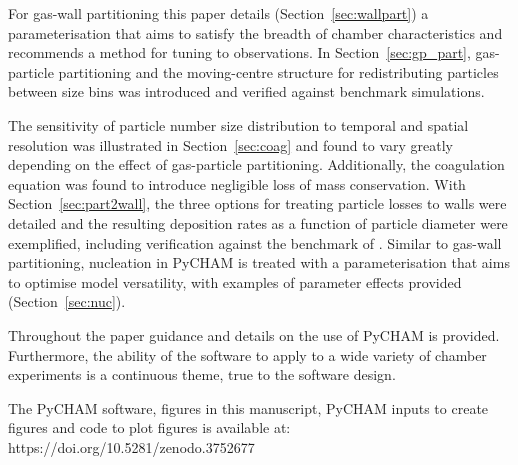 \documentclass[gmd, manuscript]{copernicus}
\begin{document}
For gas-wall partitioning this paper details (Section~\ref{sec:wallpart}) a parameterisation that aims to satisfy the breadth of chamber characteristics and recommends a method for tuning to observations.  In Section~\ref{sec:gp_part}, gas-particle partitioning and the moving-centre structure for redistributing particles between size bins was introduced and verified against benchmark simulations.

The sensitivity of particle number size distribution to temporal and spatial resolution was illustrated in Section~\ref{sec:coag} and found to vary greatly depending on the effect of gas-particle partitioning.  Additionally, the coagulation equation was found to introduce negligible loss of mass conservation.  With Section~\ref{sec:part2wall}, the three options for treating particle losses to walls were detailed and the resulting deposition rates as a function of particle diameter were exemplified, including verification against the benchmark of \citet{McMurry1985}.  Similar to gas-wall partitioning, nucleation in PyCHAM is treated with a parameterisation that aims to optimise model versatility, with examples of parameter effects provided (Section~\ref{sec:nuc}).

Throughout the paper guidance and details on the use of PyCHAM is provided.  Furthermore, the ability of the software to apply to a wide variety of chamber experiments is a continuous theme, true to the software design.



\codedataavailability %

 The PyCHAM software, figures in this manuscript, PyCHAM inputs to create figures and code to plot figures is available at: https://doi.org/10.5281/zenodo.3752677

\appendix
\section{}    %

\subsection{}     %


\noappendix       %

\end{document}
